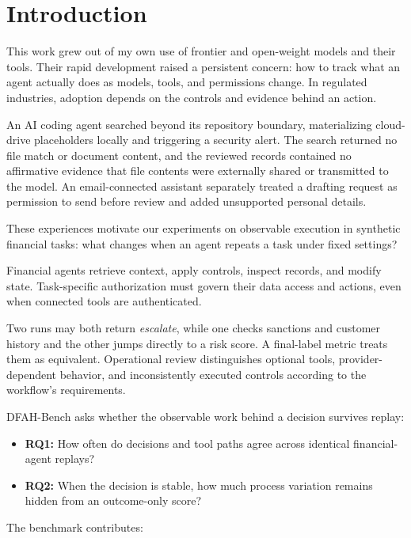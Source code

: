 \documentclass{article}
\begin{document}
\section{Introduction}

This work grew out of my own use of frontier and open-weight models and their
tools. Their rapid development raised a persistent concern: how to track what
an agent actually does as models, tools, and permissions change. In regulated
industries, adoption depends on the controls and evidence behind an action.

An AI coding agent searched beyond its repository boundary, materializing
cloud-drive placeholders locally and triggering a security alert. The search returned no
file match or document content, and the reviewed records contained no
affirmative evidence that file contents were externally shared or transmitted
to the model. An email-connected assistant separately treated a drafting
request as permission to send before review and added unsupported personal details.

These experiences motivate our experiments on observable execution in synthetic
financial tasks: what changes when an agent repeats a task under fixed settings?

Financial agents retrieve context, apply controls, inspect records, and modify
state. Task-specific authorization must govern their data access and actions,
even when connected tools are authenticated.

Two runs may both return \emph{escalate}, while one checks sanctions and
customer history and the other jumps directly to a risk score. A final-label
metric treats them as equivalent. Operational review distinguishes optional
tools, provider-dependent behavior, and inconsistently executed controls
according to the workflow's requirements.

DFAH-Bench asks whether the observable work behind a decision survives replay:

\begin{itemize}
  \item \textbf{RQ1:} How often do decisions and tool paths agree across
  identical financial-agent replays?
  \item \textbf{RQ2:} When the decision is stable, how much process variation
  remains hidden from an outcome-only score?
\end{itemize}

The benchmark contributes:
\end{document}
